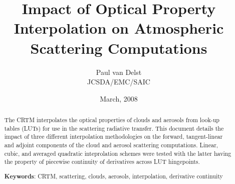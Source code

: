




\newcommand{\rb}[1]{\raisebox{1.5ex}[0pt]{#1}}
\newcommand{\po}{\ensuremath{p_{0}}}
\newcommand{\bpo}{\boldmath\po\unboldmath}
\newcommand{\Dp}{\ensuremath{\Delta p}}
\newcommand{\bDp}{\boldmath\Dp\unboldmath}
\newcommand{\reff}{\ensuremath{R_{eff}}}
\newcommand{\breff}{\boldmath\reff\unboldmath}
\newcommand{\bhpa}{\textbf{(hPa)}}
\newcommand{\bmicron}{\boldmath\micron\unboldmath}

\title{Impact of Optical Property Interpolation on Atmospheric Scattering Computations}
\author{Paul van Delst\\JCSDA/EMC/SAIC}
\date{March, 2008}



\maketitle

\begin{abstract}
The CRTM interpolates the optical properties of clouds and aerosols from look-up tables (LUTs) for use in the scattering radiative transfer. This document details the impact of three different interpolation methodologies on the forward, tangent-linear and adjoint components of the cloud and aerosol scattering computations. Linear, cubic, and averaged quadratic inteprolation schemes were tested with the latter having the property of piecewise continuity of derivatives across LUT hingepoints.

\textbf{Keywords}: CRTM, scattering, clouds, aerosols, interpolation, derivative continuity
\end{abstract}


